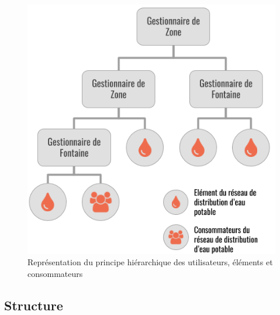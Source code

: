 \documentclass{EPL-master-thesis-covers-FR}
\begin{document}
			\begin{figure}
				\centering
				\includegraphics[scale=0.45]{images/principe_hierarchique}
				\caption{Représentation du principe hiérarchique des utilisateurs, éléments et consommateurs}
				\label{fig:principe_hierarchique}
			\end{figure}

			\subsection*{Structure}
\end{document}

